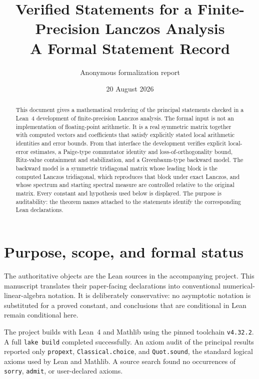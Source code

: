 \documentclass[11pt]{article}
\title{Verified Statements for a Finite-Precision Lanczos Analysis\\
\large A Formal Statement Record}
\author{Anonymous formalization report}
\date{20 August 2026}
\theoremstyle{definition}
\begin{document}
\maketitle

\begin{abstract}
This document gives a mathematical rendering of the principal statements
checked in a Lean~4 development of finite-precision Lanczos analysis.  The
formal input is not an implementation of floating-point arithmetic.  It is a
real symmetric matrix together with computed vectors and coefficients that
satisfy explicitly stated local arithmetic identities and error bounds.  From
that interface the development verifies explicit local-error estimates, a
Paige-type commutator identity and loss-of-orthogonality bound, Ritz-value
containment and stabilization, and a Greenbaum-type backward model.  The
backward model is a symmetric tridiagonal matrix whose leading block is the
computed Lanczos tridiagonal, which reproduces that block under exact Lanczos,
and whose spectrum and starting spectral measure are controlled relative to
the original matrix.  Every constant and hypothesis used below is displayed.
The purpose is auditability: the theorem names attached to the statements
identify the corresponding Lean declarations.
\end{abstract}

\section{Purpose, scope, and formal status}

The authoritative objects are the Lean sources in the accompanying project.
This manuscript translates their paper-facing declarations into conventional
numerical-linear-algebra notation.  It is deliberately conservative: no
asymptotic notation is substituted for a proved constant, and conclusions
that are conditional in Lean remain conditional here.

The project builds with Lean~4 and Mathlib using the pinned toolchain
\texttt{v4.32.2}.  A full \texttt{lake build} completed successfully.  An
axiom audit of the principal results reported only \texttt{propext},
\texttt{Classical.choice}, and \texttt{Quot.sound}, the standard logical
axioms used by Lean and Mathlib.  A source search found no occurrences of
\texttt{sorry}, \texttt{admit}, or user-declared axioms.

\begin{center}
\end{center}
\end{document}
